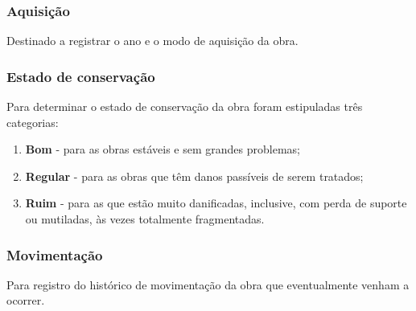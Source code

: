 \subsubsection{Aquisição}
Destinado a registrar o ano e o modo de aquisição da obra.

\subsubsection{Estado de conservação}
Para determinar o estado de conservação da obra foram estipuladas três categorias:
\begin{enumerate}
	\item \textbf{Bom}	- para as obras estáveis e sem grandes problemas;
	\item \textbf{Regular} - para as obras que têm danos passíveis de serem tratados;
	\item \textbf{Ruim} - para as que estão muito danificadas, inclusive, com perda de suporte ou mutiladas, às vezes totalmente fragmentadas.
\end{enumerate}

\subsubsection{Movimentação}
Para registro do histórico de movimentação da obra que eventualmente venham a ocorrer.

